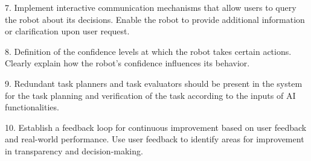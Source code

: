 {7. Implement interactive communication mechanisms that allow users to query the robot about its decisions. Enable the robot to provide additional information or clarification upon user request.

8. Definition of the confidence levels at which the robot takes certain actions. Clearly explain how the robot's confidence influences its behavior.

9. Redundant task planners and task evaluators should be present in the system for the task planning and verification of the task according to the inputs of AI functionalities.





10. Establish a feedback loop for continuous improvement based on user feedback and real-world performance. Use user feedback to identify areas for improvement in transparency and decision-making.

}
